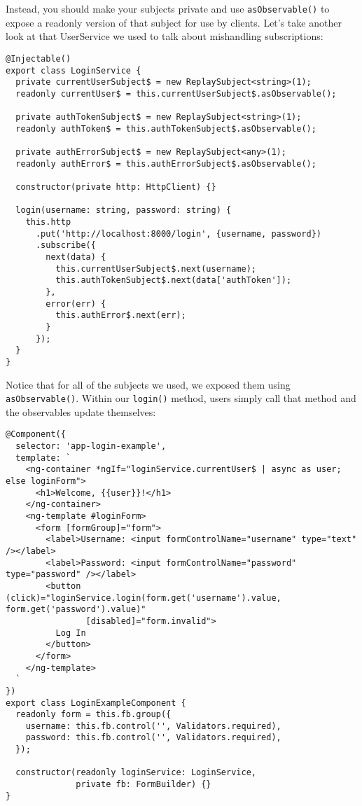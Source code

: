 Instead, you should make your subjects private and use \lstinline{asObservable()} to expose a readonly version of that subject for use by clients. Let’s take another look at that UserService we used to talk about mishandling subscriptions:

\begin{lstlisting}
@Injectable()
export class LoginService {
  private currentUserSubject$ = new ReplaySubject<string>(1);
  readonly currentUser$ = this.currentUserSubject$.asObservable();

  private authTokenSubject$ = new ReplaySubject<string>(1);
  readonly authToken$ = this.authTokenSubject$.asObservable();

  private authErrorSubject$ = new ReplaySubject<any>(1);
  readonly authError$ = this.authErrorSubject$.asObservable();

  constructor(private http: HttpClient) {}

  login(username: string, password: string) {
    this.http
      .put('http://localhost:8000/login', {username, password})
      .subscribe({
        next(data) {
          this.currentUserSubject$.next(username);
          this.authTokenSubject$.next(data['authToken']);
        },
        error(err) {
          this.authError$.next(err);
        }
      });
  }
}  
\end{lstlisting}

Notice that for all of the subjects we used, we exposed them using \lstinline{asObservable()}. Within our \lstinline{login()} method, users simply call that method and the observables update themselves:
\begin{lstlisting}
@Component({
  selector: 'app-login-example',
  template: `
    <ng-container *ngIf="loginService.currentUser$ | async as user; else loginForm">
      <h1>Welcome, {{user}}!</h1>
    </ng-container>
    <ng-template #loginForm>
      <form [formGroup]="form">
        <label>Username: <input formControlName="username" type="text" /></label>
        <label>Password: <input formControlName="password" type="password" /></label>
        <button (click)="loginService.login(form.get('username').value, form.get('password').value)" 
                [disabled]="form.invalid">
          Log In
        </button>
      </form>
    </ng-template>
  `
})
export class LoginExampleComponent {
  readonly form = this.fb.group({
    username: this.fb.control('', Validators.required),
    password: this.fb.control('', Validators.required),
  });

  constructor(readonly loginService: LoginService,
              private fb: FormBuilder) {}
}  
\end{lstlisting}

